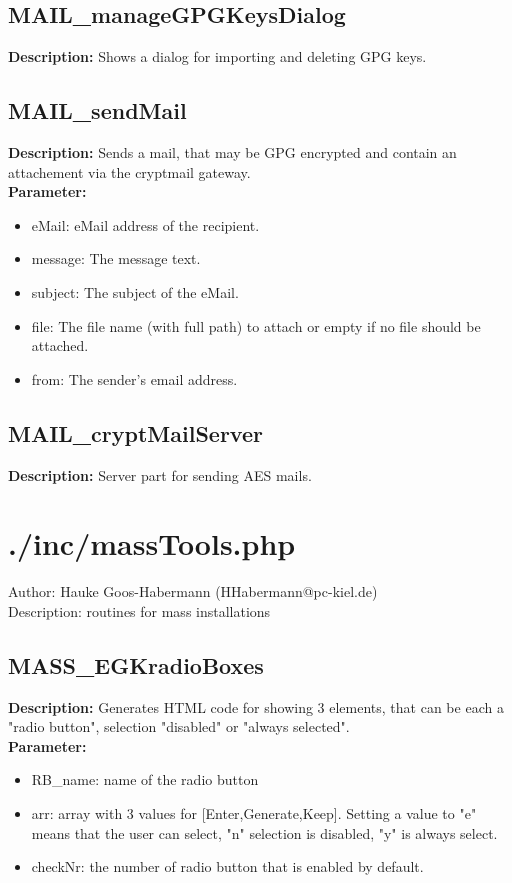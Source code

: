 \subsection{MAIL\_manageGPGKeysDialog}
\textbf{Description:} Shows a dialog for importing and deleting GPG keys.\\

\subsection{MAIL\_sendMail}
\textbf{Description:} Sends a mail, that may be GPG encrypted and contain an attachement via the cryptmail gateway.\\
\textbf{Parameter:}
\begin{itemize}
\item eMail: eMail address of the recipient.
\item message: The message text.
\item subject: The subject of the eMail.
\item file: The file name (with full path) to attach or empty if no file should be attached.
\item from: The sender's email address.
\end{itemize}

\subsection{MAIL\_cryptMailServer}
\textbf{Description:} Server part for sending AES mails.\\

\newpage\section{./inc/massTools.php}
 Author: Hauke Goos-Habermann (HHabermann@pc-kiel.de)\\
 Description: routines for mass installations\\

\subsection{MASS\_EGKradioBoxes}
\textbf{Description:} Generates HTML code for showing 3 elements, that can be each a "radio button", selection "disabled" or "always selected".\\
\textbf{Parameter:}
\begin{itemize}
\item RB\_name: name of the radio button
\item arr: array with 3 values for [Enter,Generate,Keep]. Setting a value to "e" means that the user can select, "n" selection is disabled, "y" is always select.
\item checkNr: the number of radio button that is enabled by default.
\end{itemize}

